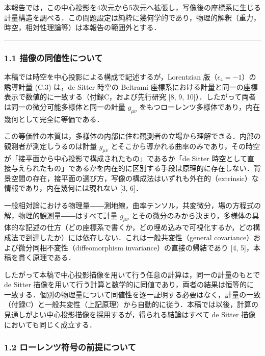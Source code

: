 \documentclass[a4paper,11pt]{ltjsarticle}
\theoremstyle{definition}
\begin{document}
本報告では，この中心投影を4次元から5次元へ拡張し，写像後の座標系に生じる計量構造を調べる．この問題設定は純粋に幾何学的であり，物理的解釈（重力，時空，相対性理論等）は本報告の範囲外とする．

\begin{center}\rule{0.5\linewidth}{0.5pt}\end{center}

\subsubsection{1.1 描像の同値性について}\label{ux63cfux50cfux306eux540cux5024ux6027ux306bux3064ux3044ux3066}

本稿では時空を中心投影による構成で記述するが，Lorentzian 版（\(\epsilon_4 = -1\)）の誘導計量 (C.3) は，de Sitter 時空の Beltrami 座標系における計量と同一の座標表示で数値的に一致する（付録C，および先行研究 {[}8, 9, 10{]}）．したがって両者は同一の微分可能多様体と同一の計量 \(g_{\mu\nu}\) をもつローレンツ多様体であり，内在幾何として完全に等価である．

この等価性の本質は，多様体の内部に住む観測者の立場から理解できる．内部の観測者が測定しうるのは計量 \(g_{\mu\nu}\) とそこから導かれる曲率のみであり，その時空が「接平面から中心投影で構成されたもの」であるか「de Sitter 時空として直接与えられたもの」であるかを内在的に区別する手段は原理的に存在しない．背景空間の存在，接平面の選び方，写像の構成法はいずれも外在的（extrinsic）な情報であり，内在幾何には現れない {[}3, 6{]}．

一般相対論における物理量――測地線，曲率テンソル，共変微分，場の方程式の解，物理的観測量――はすべて計量 \(g_{\mu\nu}\) とその微分のみから決まり，多様体の具体的な記述の仕方（どの座標系で書くか，どの埋め込みで可視化するか，どの構成法で到達したか）には依存しない．これは一般共変性（general covariance）および微分同相不変性（diffeomorphism invariance）の直接の帰結であり {[}4, 5{]}，本稿を貫く原理である．

したがって本稿で中心投影描像を用いて行う任意の計算は，同一の計量のもとで de Sitter 描像を用いて行う計算と数学的に同値であり，両者の結果は恒等的に一致する．個別の物理量について同値性を逐一証明する必要はなく，計量の一致（付録C）と一般共変性（上記原理）から自動的に従う．本稿では以後，計算の見通しがよい中心投影描像を採用するが，得られる結論はすべて de Sitter 描像においても同じく成立する．

\subsubsection{1.2 ローレンツ符号の前提について}\label{ux30edux30fcux30ecux30f3ux30c4ux7b26ux53f7ux306eux524dux63d0ux306bux3064ux3044ux3066}
\end{document}
